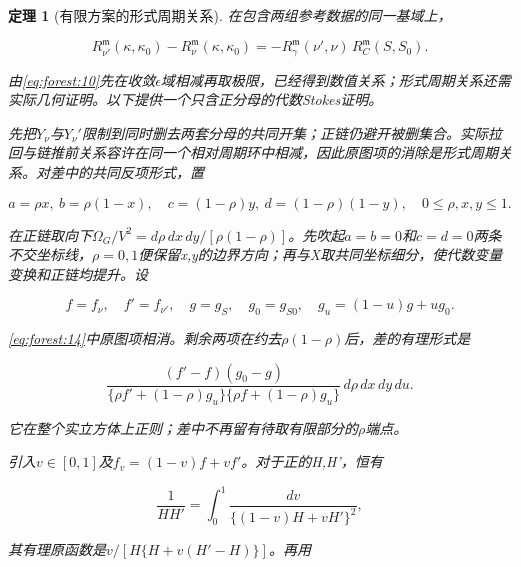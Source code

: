 \documentclass[11pt,a4paper,oneside]{ctexrep}
\theoremstyle{cnplain}
\newtheorem{theorem}{定理}[chapter]
\theoremstyle{definition}
\theoremstyle{remark}
\begin{document}
\begin{theorem}[有限方案的形式周期关系]

\label{thm:forest:6.1} 在包含两组参考数据的同一基域上，

\begin{equation}
R_{\nu'}^{\mathfrak m}(\kappa,\kappa_0)
     -R_\nu^{\mathfrak m}(\kappa,\kappa_0)
       =-R_\gamma^{\mathfrak m}(\nu',\nu)\,
                         R_C^{\mathfrak m}(S,S_0).              \label{eq:forest:20}
\end{equation}

由\eqref{eq:forest:10}先在收敛\(\epsilon \)域相减再取极限，已经得到数值关系；形式周期关系还需实际几何证明。以下提供一个只含正分母的代数Stokes证明。

先把\(Y_\nu \)与\(Y_\nu '\)限制到同时删去两套分母的共同开集；正链仍避开被删集合。实际拉回与链推前关系容许在同一个相对周期环中相减，因此原图项的消除是形式周期关系。对差中的共同反项形式，置

\begin{equation}
a=\rho x,\ b=\rho(1-x),\quad
 c=(1-\rho)y,\ d=(1-\rho)(1-y),\quad 0\le\rho,x,y\le1.
\end{equation}

在正链取向下\(\Omega _G/V^{2}=d\rho \,dx\,dy/[\rho (1- \rho )]\)。先吹起\({a=b=0}\)和\({c=d=0}\)两条不交坐标线，\(\rho =0,1\)便保留x,y的边界方向；再与X取共同坐标细分，使代数变量变换和正链均提升。设

\begin{equation}
f=f_\nu,\quad f'=f_{\nu'},\quad g=g_S,\quad g_0=g_{S0},
 \quad g_u=(1-u)g+ug_0.
\end{equation}

\eqref{eq:forest:14}中原图项相消。剩余两项在约去\(\rho (1- \rho )\)后，差的有理形式是

\begin{equation}
\frac{(f'-f)(g_0-g)}
  {\{\rho f'+(1-\rho)g_u\}\{\rho f+(1-\rho)g_u\}}\,
                                 d\rho\,dx\,dy\,du.             \label{eq:forest:21}
\end{equation}

它在整个实立方体上正则；差中不再留有待取有限部分的\(\rho \)端点。

引入\(v\in [0,1]\)及\(f_v=(1- v)f+vf'\)。对于正的H,H'，恒有

\begin{equation}
\frac1{HH'}=\int_0^1\frac{dv}{\{(1-v)H+vH'\}^2},              \label{eq:forest:22}
\end{equation}

其有理原函数是\(v/[H\{H+v(H'- H)\}]\)。再用


\end{theorem}
\end{document}
